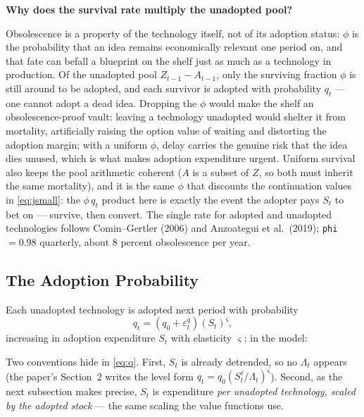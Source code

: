 \documentclass[11pt]{article}
\newcommand{\intuition}[2]{%
  \par\medskip\noindent\hspace*{\fill}%
  \colorbox{intuitionblue}{\parbox{0.94\linewidth}{\textbf{#1}\par\smallskip #2}}%
  \hspace*{\fill}\par\medskip}
\newcommand{\modelcode}[1]{%
  \par\smallskip\noindent\hspace*{\fill}%
  \fbox{\parbox{0.94\linewidth}{\small\ttfamily\raggedright #1}}%
  \hspace*{\fill}\par\smallskip}
\begin{document}
\intuition{Why does the survival rate multiply the unadopted pool?}{%
Obsolescence is a property of the technology itself, not of its adoption
status: $\phi$ is the probability that an idea remains economically relevant
one period on, and that fate can befall a blueprint on the shelf just as much
as a technology in production. Of the unadopted pool $Z_{t-1}-A_{t-1}$, only
the surviving fraction $\phi$ is still around to be adopted, and each survivor
is adopted with probability $q_t$ --- one cannot adopt a dead idea. Dropping
the $\phi$ would make the shelf an obsolescence-proof vault: leaving a
technology unadopted would shelter it from mortality, artificially raising the
option value of waiting and distorting the adoption margin; with a uniform
$\phi$, delay carries the genuine risk that the idea dies unused, which is
what makes adoption expenditure urgent. Uniform survival also keeps the pool
arithmetic coherent ($A$ is a subset of $Z$, so both must inherit the same
mortality), and it is the same $\phi$ that discounts the continuation values
in \eqref{eq:jsmall}: the $\phi\, q_t$ product here is exactly the event the
adopter pays $S_t$ to bet on --- survive, then convert. The single rate for
adopted and unadopted technologies follows Comin--Gertler (2006) and
Anzoategui et al.\ (2019); \texttt{phi} $=0.98$ quarterly, about 8 percent
obsolescence per year.}

\subsection{The Adoption Probability}

Each unadopted technology is adopted next period with probability
\begin{equation}\label{eq:q}
    q_t = \left(q_0 + \varepsilon^{q}_t\right)\left(S_t\right)^{\varsigma},
\end{equation}
increasing
in adoption expenditure $S_t$ with elasticity $\varsigma$; in the model:
\modelcode{q = (kappaprob+epsi\_q)*(S)\^{}(varsigma);}
Two conventions hide in
\eqref{eq:q}. First, $S_t$ is already detrended, so no $\Lambda_t$ appears (the
paper's Section~2 writes the level form $q_t = q_0(S^{\ell}_t/\Lambda_t)^{\varsigma}$).
Second, as the next subsection makes precise, $S_t$ is expenditure \emph{per
unadopted technology, scaled by the adopted stock} --- the same scaling the value
functions use.
\end{document}

